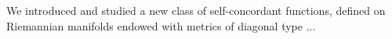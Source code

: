 We introduced and studied a new class of self-concordant functions,
defined on Riemannian manifolds endowed with metrics of diagonal
type ...
